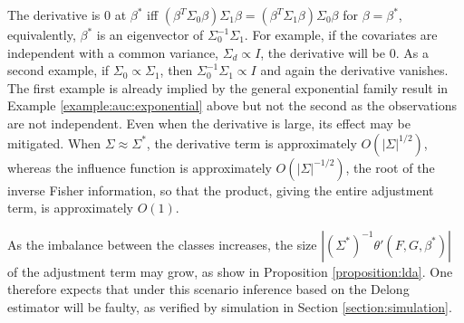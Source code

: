 \documentclass[12pt]{article}
\DeclareMathOperator*{\diag}{diag}
\renewcommand{\t}[1]{{#1}^T}
\renewcommand{\star}[1]{{#1}^\ast}
\newcommand{\F}{F}
\newcommand{\G}{G}
\newcommand{\auc}{\theta}
\theoremstyle{definition}
\begin{document}
  The derivative is $0$ at $\star\beta$ iff
  $(\t\beta\Sigma_0\beta)\Sigma_1\beta=(\t\beta\Sigma_1\beta)\Sigma_0\beta$
  for $\beta=\star\beta$, equivalently, $\star\beta$ is an eigenvector
  of $\Sigma_0^{-1}\Sigma_1$. For example, if the
  covariates are independent with a common variance, $\Sigma_d\propto I$, the derivative will be 0. As a second example, if $\Sigma_0\propto\Sigma_1$, then $\Sigma_0^{-1}\Sigma_1\propto I$ and again the derivative vanishes. %
  The first example is already implied by the general exponential
  family result in Example \ref{example:auc:exponential} above but not the second as the
  observations are not independent.
  Even when the derivative is large, its effect may be mitigated. When
  $\Sigma\approx\star\Sigma$, the derivative term is approximately
  $O(|\Sigma|^{1/2})$, whereas the influence function is approximately
  $O(|\Sigma|^{-1/2})$, the root of the inverse Fisher information, so
  that the product, giving the entire adjustment term, is
  approximately $O(1)$.

  As the imbalance between the classes increases, the size
  $|(\star{\Sigma})^{-1} \auc'(\F,\G,\star{\beta})|$ of the adjustment
  term may grow, as show in Proposition \ref{proposition:lda}.
  One therefore expects that under this scenario inference based on the Delong estimator will be faulty, as verified by simulation in Section \ref{section:simulation}. %
  
\end{document}
